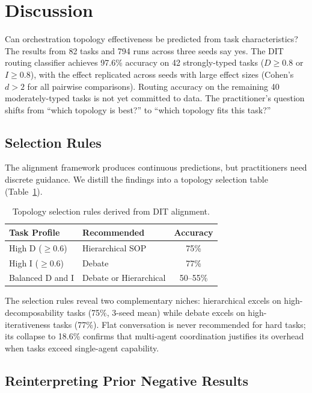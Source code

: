 \section{Discussion}

Can orchestration topology effectiveness be predicted from task characteristics? The results from 82 tasks and 794 runs across three seeds say yes. The DIT routing classifier achieves 97.6\% accuracy on 42 strongly-typed tasks ($D \geq 0.8$ or $I \geq 0.8$), with the effect replicated across seeds with large effect sizes (Cohen's $d > 2$ for all pairwise comparisons). Routing accuracy on the remaining 40 moderately-typed tasks is not yet committed to data. The practitioner's question shifts from ``which topology is best?'' to ``which topology fits this task?''

\subsection{Selection Rules}\label{selection-rules}

The alignment framework produces continuous predictions, but practitioners need discrete guidance. We distill the findings into a topology selection table (Table~\ref{tab:topology_selection_rules}).

\begin{table}[t]
\centering
\caption{Topology selection rules derived from DIT alignment.}
\label{tab:topology_selection_rules}
\small
\begin{tabular}{p{3.2cm}lc}
\toprule
Task Profile & Recommended & Accuracy \\
\midrule
High D ($\geq$0.6) & Hierarchical SOP & 75\% \\
High I ($\geq$0.6) & Debate & 77\% \\
Balanced D and I & Debate or Hierarchical & 50--55\% \\
\bottomrule
\end{tabular}
\end{table}

The selection rules reveal two complementary niches: hierarchical excels on high-decomposability tasks (75\%, 3-seed mean) while debate excels on high-iterativeness tasks (77\%). Flat conversation is never recommended for hard tasks; its collapse to 18.6\% confirms that multi-agent coordination justifies its overhead when tasks exceed single-agent capability.

\subsection{Reinterpreting Prior Negative Results}\label{reinterpreting-prior-results}

